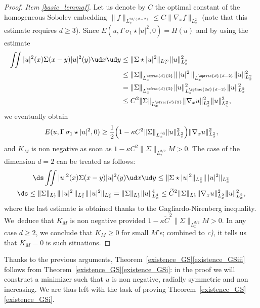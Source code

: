 \begin{proof}
\textit{Item \eqref{basic_lemmaf}}. Let us denote by $C$ the optimal constant of the homogeneous Sobolev embedding $\|f\|_{L_{x}^{2d/(d-2)}}\leq C\|\nabla_{x}f\|_{L_{x}^{2}}$ (note that this estimate requires $d\geq 3$). Since $E(u,\Gamma\,\sigma_{1}\star|u|^{2},0)=H(u)$ and by using the estimate\vspace*{-3pt}
\begin{align*}
\iint|u|^{2}(x)\Sigma(x-y)|u|^{2}(y)\ud x\ud y&\leq\|\Sigma\star|u|^{2}\|_{L_{x}^{\infty}}\|u\|_{L_{x}^{2}}^{2}\\
&\leq\|\Sigma\|_{L_{x}^{\sfrac{d}{2}}}\|\,|u|^{2}\,\|_{L_{x}^{\spfrac{d}{d-2}}}\|u\|_{L_{x}^{2}}^{2}\\
&=\|\Sigma\|_{L_{x}^{\sfrac{d}{2}}}\|u\|_{L_{x}^{\spfrac{2d}{d-2}}}^{2}\|u\|_{L_{x}^{2}}^{2}\\
&\leq C^{2}\|\Sigma\|_{L_{x}^{\sfrac{d}{2}}}\|\nabla_{x}u\|_{L_{x}^{2}}^{2}\|u\|_{L_{x}^{2}}^{2},
\end{align*}
we eventually obtain\vspace*{-3pt}
\[
E(u,\Gamma\,\sigma_{1}\star|u|^{2},0)\geq\frac{1}{2}\Bigl(1-\kappa C^{2}\|\Sigma\|_{L_{x}^{\sfrac{d}{2}}}\|u\|_{L_{x}^{2}}^{2}\Bigr)\|\nabla_{x}u\|_{L_{x}^{2}}^{2},
\]
and $K_{M}$ is non negative as soon as $1-\kappa C^{2}\|\Sigma\|_{L_{x}^{d/2}}M>0$. The case of the dimension $d=2$ can be treated as follows:\vspace*{-5pt}
\begin{multline*}
\ds\iint|u|^{2}(x)\Sigma(x-y)|u|^{2}(y)\ud x\ud y\leq\|\Sigma\star|u|^{2}\|_{L_{x}^{2}}\|\,|u|^{2}\|_{L_{x}^{2}}\\
\ds\leq\|\Sigma\|_{L_{x}^{1}}\|\,|u|^{2}\,\|_{L_{x}^{2}}\|\,|u|^{2}\|_{L_{x}^{2}}=\|\Sigma\|_{L_{x}^{1}}\|u\|_{L_{x}^{4}}^{4}\leq \widetilde{C}^{2}\|\Sigma\|_{L_{x}^{1}}\|\nabla_{x}u\|_{L_{x}^{2}}^{2}\|u\|_{L_{x}^{2}}^{2},
\end{multline*}
where the last estimate is obtained thanks to the Gagliardo-Nirenberg inequality.
We~deduce that $K_{M}$ is non negative provided $1-\kappa \tilde C^{2}\|\Sigma\|_{L_{x}^{d/2}}M>0$.
In any case $d\geq 2$, we conclude that $K_M\geq 0$ for small $M$'s; combined to \textit{c)}, it tells us that $K_M=0$ is such situations.
\end{proof}

Thanks to the previous arguments, Theorem~\ref{existence_GS}\eqref{existence_GSiii} follows from Theorem~\ref{existence_GS}\eqref{existence_GSi}: in the proof we will construct a minimizer such that $u$ is non negative, radially symmetric and non increasing. We are thus left with the task of proving Theorem~\ref{existence_GS}\eqref{existence_GSi}.

